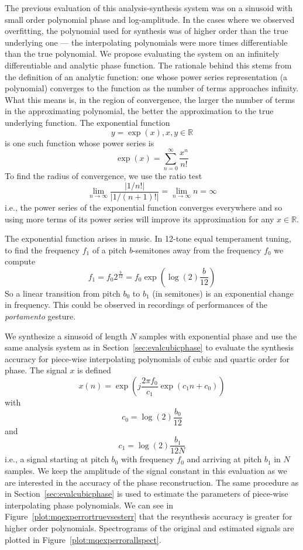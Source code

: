 The previous evaluation of this analysis-synthesis system was on a sinusoid with
small order polynomial phase and log-amplitude. In the cases where we observed overfitting, the
polynomial used for synthesis was of higher order than the true underlying one
--- the interpolating polynomials were more times differentiable than the true
polynomial. We propose evaluating the system on an infinitely differentiable and
analytic phase function. The rationale behind this stems from the definition of
an analytic function: one whose power series representation (a polynomial)
converges to the function as the number of terms approaches infinity. What this
means is, in the region of convergence, the larger the number of terms in the
approximating polynomial, the better the approximation to the true underlying
function. The exponential function
\[
    y=\exp(x), x,y \in \mathbb{R}
\]
is one such function whose power series is
\[
    \exp(x)=\sum_{n=0}^{\infty} \frac{x^{n}}{n!}
\]
To find the radius of convergence, we use the ratio test
\[
    \lim_{n \rightarrow \infty} \frac{|1/n!|}{|1/(n+1)!|} = \lim_{n \rightarrow \infty} n = \infty
\]
i.e., the power series of the exponential function converges everywhere and so
using more terms of its power series will improve its approximation for
any $x \in \mathbb{R}$.

The exponential function arises in music. In 12-tone equal temperament tuning,
to find the frequency $f_{1}$ of a pitch $b$-semitones away from the frequency
$f_{0}$ we compute
\[
    f_{1}=f_{0}2^{\frac{b}{12}}=f_{0}\exp(\log(2)\frac{b}{12})
\]
So a linear transition from pitch $b_{0}$ to $b_{1}$ (in semitones) is an
exponential change in frequency. This could be observed in recordings of
performances of the \textit{portamento} gesture.

We synthesize a sinusoid  of length $N$ samples with exponential phase and use
the same analysis system as in Section~\ref{sec:evalcubicphase} to evaluate the
synthesis accuracy for piece-wise interpolating polynomials of cubic and quartic
order for phase. The signal $x$ is defined
\[
    x(n) = \exp(j\frac{2\pi f_{0}}{c_{1}}\exp(c_{1}n + c_{0}))
\]
with
\[
    c_{0} = \log(2)\frac{b_{0}}{12}
\]
and
\[
    c_{1}= \log(2)\frac{b_{1}}{12N}
\]
i.e., a signal starting at pitch $b_{0}$ with frequency $f_{0}$ and arriving at
pitch $b_{1}$ in $N$ samples. We keep the amplitude of the signal constant in
this evaluation as we are interested in the accuracy of the phase
reconstruction. The same procedure as in
Section~\ref{sec:evalcubicphase} is used to estimate the parameters of
piece-wise interpolating phase polynomials. We can see in
Figure~\ref{plot:mqexperrortruevsesterr} that the resynthesis accuracy is
greater for higher order polynomials. Spectrograms of the original and estimated
signals are plotted in Figure~\ref{plot:mqexperrorallspect}.


